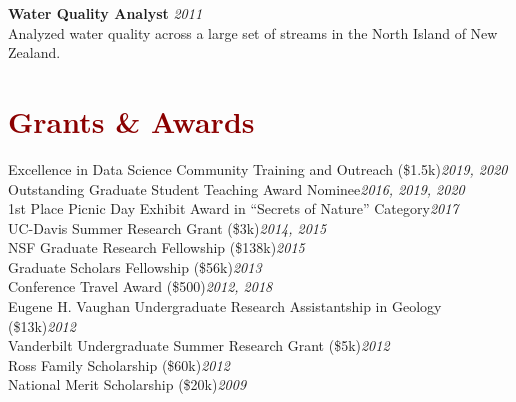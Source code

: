 \documentclass[11pt,margin,line]{resume}
\begin{document}
\begin{resume}
\textbf{Water Quality Analyst} \hfill \emph{2011}\\
Analyzed water quality across a large set of streams in the North Island of New Zealand.
\vspace{-1.5mm}


\vspace{-1mm}

\section{\large\textcolor{DarkRed}{Grants \& Awards}}

Excellence in Data Science Community Training and Outreach (\$1.5k)\hfill \emph{2019, 2020}\\
Outstanding Graduate Student Teaching Award Nominee\hfill \emph{2016, 2019, 2020}\\
1st Place Picnic Day Exhibit Award in “Secrets of Nature” Category\hfill \emph{2017}\\
UC-Davis Summer Research Grant (\$3k)\hfill \emph{2014, 2015}\\
NSF Graduate Research Fellowship (\$138k)\hfill \emph{2015}\\
Graduate Scholars Fellowship (\$56k)\hfill \emph{2013}\\
Conference Travel Award (\$500)\hfill \emph{2012, 2018}\\
Eugene H. Vaughan Undergraduate Research Assistantship in Geology (\$13k)\hfill \emph{2012}\\
Vanderbilt Undergraduate Summer Research Grant (\$5k)\hfill \emph{2012}\\
Ross Family Scholarship (\$60k)\hfill \emph{2012}\\
National Merit Scholarship (\$20k)\hfill \emph{2009}\\\\\\\\

\begin{comment}


\end{comment}
\end{resume}
\end{document}
